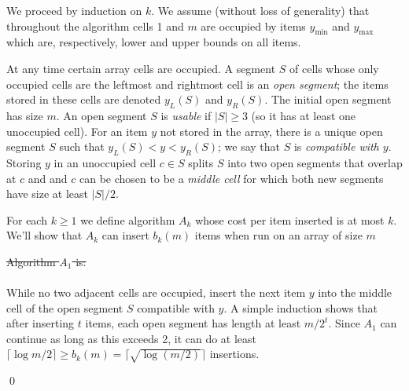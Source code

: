 \documentclass[unicode,review]{siamart1116}
\newenvironment{proofof}[1]{\noindent{\textbf { Proof of #1:}}} {{\qed}}
\numberwithin{theorem}{section}
\providecommand{\DIFadd}[1]{{\protect\color{blue}\uwave{#1}}} %
\providecommand{\DIFdel}[1]{{\protect\color{red}\sout{#1}}}                      %
\providecommand{\DIFaddbegin}{} %
\providecommand{\DIFaddend}{} %
\providecommand{\DIFdelbegin}{} %
\providecommand{\DIFdelend}{} %
\newcommand{\DIFscaledelfig}{0.5}
\newlength{\DIFdelgraphicswidth} %
\newlength{\DIFdelgraphicsheight} %
\newcommand{\DIFaddincludegraphics}[2][]{{\color{blue}\fbox{\DIFOincludegraphics[#1]{#2}}}} %
\newcommand{\DIFdelincludegraphics}[2][]{%
\sbox{\DIFdelgraphicsbox}{\DIFOincludegraphics[#1]{#2}}%
\settoboxwidth{\DIFdelgraphicswidth}{\DIFdelgraphicsbox} %
\settoboxtotalheight{\DIFdelgraphicsheight}{\DIFdelgraphicsbox} %
\scalebox{\DIFscaledelfig}{%
\parbox[b]{\DIFdelgraphicswidth}{\usebox{\DIFdelgraphicsbox}\\[-\baselineskip] \rule{\DIFdelgraphicswidth}{0em}}\llap{\resizebox{\DIFdelgraphicswidth}{\DIFdelgraphicsheight}{%
\setlength{\unitlength}{\DIFdelgraphicswidth}%
\begin{picture}(1,1)%
\thicklines\linethickness{2pt} %
{\color[rgb]{1,0,0}\put(0,0){\framebox(1,1){}}}%
{\color[rgb]{1,0,0}\put(0,0){\line( 1,1){1}}}%
{\color[rgb]{1,0,0}\put(0,1){\line(1,-1){1}}}%
\end{picture}%
}\hspace*{3pt}}} %
} %
\DeclareRobustCommand{\DIFaddbegin}{\DIFOaddbegin \let\includegraphics\DIFaddincludegraphics} %
\DeclareRobustCommand{\DIFaddend}{\DIFOaddend \let\includegraphics\DIFOincludegraphics} %
\DeclareRobustCommand{\DIFdelbegin}{\DIFOdelbegin \let\includegraphics\DIFdelincludegraphics} %
\DeclareRobustCommand{\DIFdelend}{\DIFOaddend \let\includegraphics\DIFOincludegraphics} %
\begin{document}
\begin{proofof}{\Cref{thm:ub}}
We proceed by induction on $k$. We assume (without loss of generality) that throughout the algorithm
cells 1 and $m$ are occupied by items $y_{\min}$ and $y_{\max}$ which are, respectively, lower and upper bounds
on all items.   

At any time certain array cells are occupied.   A segment $S$ of cells whose only occupied cells are the leftmost and rightmost cell is an {\em open segment};
the items stored in these cells
are denoted $y_L(S)$ and $y_R(S)$. The initial open segment has size $m$.  
An open segment $S$ is {\em usable} if $|S| \geq 3$ (so it has at least one unoccupied cell).
For an item $y$ not stored in the array, there is a unique open segment $S$ such that
$y_L(S)<y<y_R(S)$; we say that $S$ is  {\em compatible with $y$}.
Storing $y$ in an unoccupied cell  $c \in S$ splits $S$   into two open
segments that overlap at $c$ and
and $c$ can be chosen to be a {\em middle cell} for which both new segments have size at least $|S|/2$. 

\iffalse
 More generally, it can be checked that given $q-1$ items to be placed in an open
interval $S$ that has at least $q-1$ unoccupied spaces we can place them evenly so that each of the $q$
open segments produced has size at least $|S|/q$.  (The worst case is $|S|=aq+1)$ for some integer $a$, and
in this case each of the $q$ resulting subsegments has length $a+1 \geq |S|/q$.)
\fi


For each $k \geq 1$ we define algorithm $A_k$ whose cost per item
inserted is at most $k$.  We'll show that $A_k$ can insert $b_k(m)$ items when
run on an array of size $m$\DIFaddbegin \DIFadd{.
}\DIFaddend 

\DIFdelbegin \DIFdel{Algorithm $A_1$ is: }\DIFdelend \DIFaddbegin \paragraph{\DIFadd{Algorithm $A_1$}} 
\DIFaddend While  no two adjacent cells are occupied, insert the next item $y$ into the middle cell of the
open segment $S$ compatible with $y$.
A simple induction shows that after inserting $t$ items, each open segment has length at least $m/2^t$. Since $A_1$ can continue as long as this exceeds 2, it can do at least $\lceil \log m/2 \rceil  \geq b_k(m)=\lceil \sqrt{\log (m/2)} \rceil $ insertions.


\end{proofof}
\end{document}
